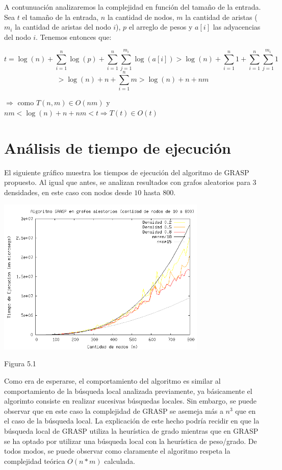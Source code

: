 \documentclass[a4paper,11pt] {article}
\begin{document}
A contunuaci\'on analizaremos la complejidad en funci\'on del tama\~{n}o de la entrada. Sea $t$ el tama\~{n}o de la entrada, $n$ la cantidad de nodos, $m$ la cantidad de aristas ($m_i$ la cantidad de aristas del nodo $i$), $p$ el arreglo de pesos y $a[i]$ las adyacencias del nodo $i$. Tenemos entonces que:

$$t=\log(n)+\sum_{i=1}^{n}\log(p)+\sum_{i=1}^{n}\sum_{j=1}^{m_i}\log(a[i])>\log(n)+\sum_{i=1}^{n}1+\sum_{i=1}^{n}\sum_{j=1}^{m_i}1$$
$$>\log(n)+n+\sum_{i=1}^{n}m>\log(n)+n+nm$$

\hspace{20pt} $\Longrightarrow$ como $T(n,m) \in O(nm)$ y $nm<\log(n)+n+nm<t \Longrightarrow T(t) \in O(t)$

\section*{Análisis de tiempo de ejecución}

El siguiente gráfico muestra los tiempos de ejecución del algoritmo de GRASP propuesto. Al igual que antes, se analizan resultados con grafos aleatorios para 3 densidades, en este caso con nodos desde $10$ hasta $800$.

\begin{center}
 \includegraphics[width=0.75\textwidth]{graficos/tiemposGrasp.png}
\begin{center}
Figura 5.1
\end{center}
\end{center}

Como era de esperarse, el comportamiento del algoritmo es similar al comportamiento de la búsqueda local analizada previamente, ya básicamente el algorimto consiste en realizar sucesivas búsquedas locales. Sin embargo, se puede observar que en este caso la complejidad de GRASP se asemeja más a $n^3$ que en el caso de la búsqueda local. La explicación de este hecho podría recidir en que la búsqueda local de GRASP utiliza la heurística de grado mientras que en GRASP se ha optado por utilizar una búsqueda local con la heurística de peso/grado. De todos modos, se puede observar como claramente el algoritmo respeta la complejidad teórica $O(n*m)$ calculada.
\end{document}
